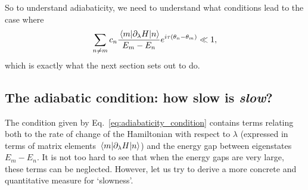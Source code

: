     So to understand adiabaticity, we need to understand what conditions lead to the case where
    \begin{equation}\label{eq:adiabaticity_condition}
        \sum_{n \neq m} c_n \frac{\mel{m}{\partial_{\lambda}H}{n}}{E_m - E_n}e^{i \tau (\theta_n-\theta_m)} \ll 1,
    \end{equation}
    which is exactly what the next section sets out to do.
    
    \subsection{The adiabatic condition: how slow is \emph{slow}?}\label{sec:2.1.2_adiabatic_condition}

    The condition given by Eq.~\eqref{eq:adiabaticity_condition} contains terms relating both to the rate of change of the Hamiltonian with respect to $\lambda$ (expressed in terms of matrix elements $\mel{m}{\partial_{\lambda}H}{n}$) and the energy gap between eigenstates $E_m - E_n$. It is not too hard to see that when the energy gaps are very large, these terms can be neglected. However, let us try to derive a more concrete and quantitative measure for `slowness'.

